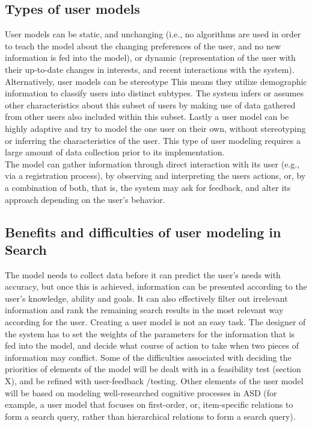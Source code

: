\documentclass[10pt]{article}
\begin{document}
\subsection{Types of user models}
User models can be static, and unchanging (i.e., no algorithms are used in order to teach the model about the changing preferences of the user, and no new information is fed into the model), or dynamic (representation of the user with their up-to-date changes in interests, and recent interactions with the system). Alternatively, user models can be stereotype
This means they utilize demographic information to classify users into distinct subtypes. The system infers or assumes other characteristics about this subset of users by making use of data gathered from other users also included within this subset. Lastly a user model can be highly adaptive and try to model the one user on their own, without stereotyping or inferring the characteristics of the user. This type of user modeling requires a large amount of data collection prior to its implementation.
\\The model can gather information through direct interaction with its user (e.g., via a registration process), by observing and interpreting the users actions, or, by a combination of both, that is, the system may ask for feedback, and alter its approach depending on the user’s behavior.

\subsection{Benefits and difficulties of user modeling in Search}
The model needs to collect data before it can predict the user’s needs with accuracy, but once this is achieved, information can be presented according to the user’s knowledge, ability and goals. It can also effectively filter out irrelevant information and rank the remaining search results in the most relevant way according for the user.
Creating a user model is not an easy task. The designer of the system has to set the weights of the parameters for the information that is fed into the model, and decide what course of action to take when two pieces of information may conflict. Some of the difficulties associated with deciding the priorities of elements of the model will be dealt with in a feasibility test (section X), and be refined with user-feedback /testing. Other elements of the user model will be based on modeling well-researched cognitive processes in ASD (for example, a user model that focuses on first-order, or, item-specific relations to form a search query, rather than hierarchical relations to form a search query).  
\end{document}

